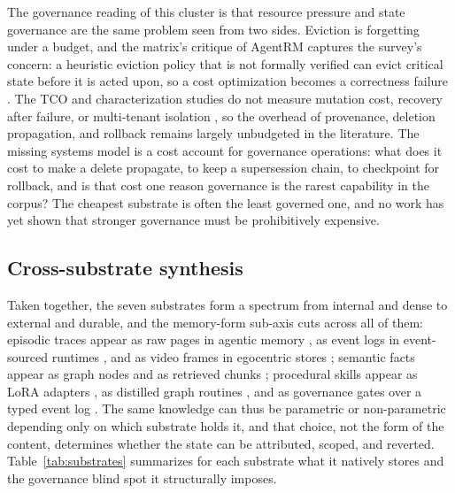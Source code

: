 The governance reading of this cluster is that resource pressure and state governance are the same problem seen from two sides. Eviction is forgetting under a budget, and the matrix's critique of AgentRM captures the survey's concern: a heuristic eviction policy that is not formally verified can evict critical state before it is acted upon, so a cost optimization becomes a correctness failure \citep{she2026agentrm}. The TCO and characterization studies do not measure mutation cost, recovery after failure, or multi-tenant isolation \citep{wolff2026costaccuracy,omri2026agentmemorycharacterization}, so the overhead of provenance, deletion propagation, and rollback remains largely unbudgeted in the literature. The missing systems model is a cost account for governance operations: what does it cost to make a delete propagate, to keep a supersession chain, to checkpoint for rollback, and is that cost one reason governance is the rarest capability in the corpus? The cheapest substrate is often the least governed one, and no work has yet shown that stronger governance must be prohibitively expensive.

\subsection{Cross-substrate synthesis}

Taken together, the seven substrates form a spectrum from internal and dense to external and durable, and the memory-form sub-axis cuts across all of them: episodic traces appear as raw pages in agentic memory \citep{yan2025generalagenticmemory}, as event logs in event-sourced runtimes \citep{nakajima2026regimes}, and as video frames in egocentric stores \citep{forte2026egostream}; semantic facts appear as graph nodes \citep{wang2026engram} and as retrieved chunks \citep{chen2023benchmarkinglargelanguagemodels}; procedural skills appear as LoRA adapters \citep{guo2026peam}, as distilled graph routines \citep{fang2026fluxmem}, and as governance gates over a typed event log \citep{malo2026projectmem}. The same knowledge can thus be parametric or non-parametric depending only on which substrate holds it, and that choice, not the form of the content, determines whether the state can be attributed, scoped, and reverted. Table~\ref{tab:substrates} summarizes for each substrate what it natively stores and the governance blind spot it structurally imposes.


